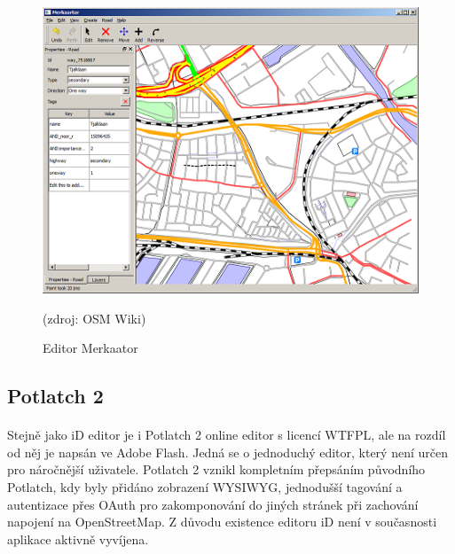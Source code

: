 \documentclass[11pt,a4paper,titlepage,oneside]{book}
\begin{document}
		\begin{figure}[!h]
			\begin{center}
				\includegraphics[width=12.5cm]{obrazky/merkaator_osm.png}
				\caption{Editor Merkaator} (zdroj: OSM Wiki\cite{wiki_merkaator})
			\end{center}
		\end{figure}

		\subsection{Potlatch 2}
			\paragraph{} Stejně jako iD editor je i Potlatch 2 online editor s licencí \ac{WTFPL}, ale na rozdíl od něj je napsán ve Adobe Flash. Jedná se o jednoduchý editor, který není určen pro náročnější uživatele. Potlatch 2 vznikl kompletním přepsáním původního Potlatch\cite{wiki_p2}, kdy byly přidáno zobrazení \ac{WYSIWYG}, jednodušší tagování a autentizace přes OAuth pro zakomponování do jiných stránek při zachování napojení na OpenStreetMap. Z důvodu existence editoru iD není v současnosti aplikace aktivně vyvíjena.

\end{document}
